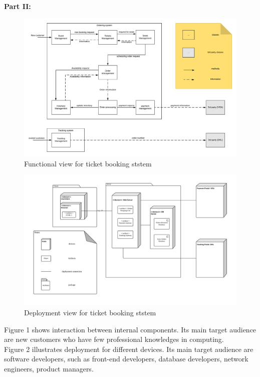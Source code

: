 \documentclass[12pt]{article}
\begin{document}
{\bf Part II: } 
\begin{figure}[H]
  \centering
  \setlength{\abovecaptionskip}{-0.1in}
  \setlength{\belowcaptionskip}{-0.15in}
	\includegraphics[width=0.8\linewidth]{topic_2.png}
	\caption{Functional view for ticket booking ststem}
\end{figure}
\begin{figure}[H]
  \centering
  \setlength{\abovecaptionskip}{-0.1in}
  \setlength{\belowcaptionskip}{-0.15in}
	\includegraphics[width=0.8\linewidth]{deploy.png}
	\caption{Deployment view for ticket booking ststem}
\end{figure}
Figure 1 shows interaction between internal components. Its main target audience are new customers who have few professional knowledges in computing.\\
Figure 2 illustrates deployment for different devices. Its main target audience are software developers, such as front-end developers, database developers, network engineers, product managers. 
\end{document}
